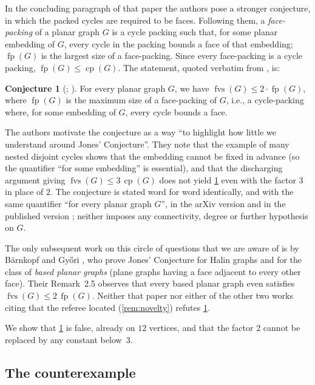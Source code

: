 \documentclass[11pt,a4paper]{article}
\theoremstyle{plain}
\theoremstyle{definition}
\newtheorem{conjecture}[theorem]{Conjecture}
\theoremstyle{remark}
\newcommand{\fvs}{\operatorname{fvs}}
\newcommand{\cp}{\operatorname{cp}}
\newcommand{\fp}{\operatorname{fp}}
\begin{document}
In the concluding paragraph of that paper the authors pose a stronger conjecture, in which the packed cycles are required to be faces. Following them, a \emph{face-packing} of a planar graph $G$ is a cycle packing such that, for some planar embedding of $G$, every cycle in the packing bounds a face of that embedding; $\fp(G)$ is the largest size of a face-packing. Since every face-packing is a cycle packing, $\fp(G)\le\cp(G)$. The statement, quoted verbatim from \cite{BDMNPP19}, is:

\begin{conjecture}[{\cite[Conjecture~2]{BDMNPP19}; \cite[Conjecture~14]{BDMNPP21}}]\label{conj:fp}
For every planar graph $G$, we have $\fvs(G) \leq 2 \cdot \fp(G)$, where $\fp(G)$ is the maximum size of a face-packing of $G$, i.e., a cycle-packing where, for some embedding of $G$, every cycle bounds a face.
\end{conjecture}

The authors motivate the conjecture as a way ``to highlight how little we understand around Jones' Conjecture''. They note that the example of many nested disjoint cycles shows that the embedding cannot be fixed in advance (so the quantifier ``for some embedding'' is essential), and that the discharging argument giving $\fvs(G)\le3\,\cp(G)$ does not yield \cref{conj:fp} even with the factor $3$ in place of $2$. The conjecture is stated word for word identically, and with the same quantifier ``for every planar graph $G$'', in the arXiv version \cite{BDMNPP19} and in the published version \cite{BDMNPP21}; neither imposes any connectivity, degree or further hypothesis on $G$.

The only subsequent work on this circle of questions that we are aware of is by Bärnkopf and Győri \cite{BG24}, who prove Jones' Conjecture for Halin graphs and for the class of \emph{based planar graphs} (plane graphs having a face adjacent to every other face). Their Remark~2.5 observes that every based planar graph even satisfies $\fvs(G)\le2\,\fp(G)$. Neither that paper nor either of the other two works citing \cite{BDMNPP19} that the referee located (\cref{rem:novelty}) refutes \cref{conj:fp}.

We show that \cref{conj:fp} is false, already on $12$ vertices, and that the factor $2$ cannot be replaced by any constant below~$3$.

\subsection*{The counterexample}
\end{document}
